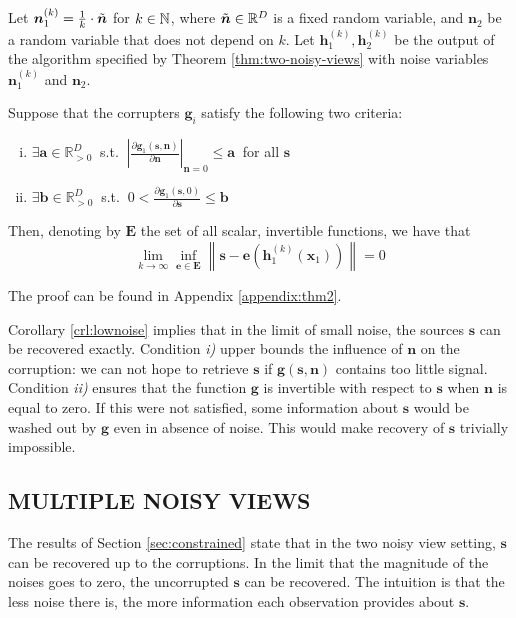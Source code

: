 \documentclass[letterpaper]{article}
\theoremstyle{definition}
\begin{document}
\begin{corollary}
\label{crl:lownoise}
Let $\bm{n}_1^{(k)} = \frac{1}{k} \cdot  \Tilde{\bm{n}}$ for $k \in \mathbb{N}$, where $\Tilde{\bm{n}}\in\mathbb{R}^D$ is a fixed random variable, and $\bm{n}_2$ be a random variable that does not depend on $k$.
Let $\bm{h}_1^{(k)}, \bm{h}_2^{(k)}$ be the output of the algorithm specified by Theorem \ref{thm:two-noisy-views} with noise variables $\bm{n}_1^{(k)}$ and $\bm{n}_2$.

Suppose that the corrupters $\bm{g}_i$ satisfy the following two criteria:
\begin{enumerate}[i)]
    \item $\exists \bm{a}  \in \mathbb{R}_{> 0}^D \: $   s.t. $\: \left|\frac{\partial \bm{g}_1(\bm{s},\bm{n})}{\partial \bm{n}} \right|_{\bm{n}=0} \leq \bm{a} \: $ for all $\bm{s}$
    \item $\exists \bm{b}  \in \mathbb{R}_{> 0}^D \: $ s.t. $\: 0<\frac{\partial \bm{g}_1(\bm{s},0)}{\partial \bm{s}} \leq \bm{b}$
\end{enumerate}
Then, denoting by $\bm{E}$ the set of all scalar, invertible functions, we have that
\[
\lim_{k \to \infty} \inf_{\bm{e}\in \bm{E}} \left \|\bm{s} - \bm{e}(\bm{h}_1^{(k)}(\bm{x}_1)) \right \| = 0
\]
\end{corollary}
The proof can be found in Appendix \ref{appendix:thm2}.

Corollary \ref{crl:lownoise} implies that in the limit of small noise, the sources $\bm{s}$ can be recovered exactly.
Condition \textit{i)} upper bounds the influence of $\bm{n}$ on the corruption: we can not hope to retrieve $\bm{s}$ if $\bm{g}(\bm{s}, \bm{n})$ contains too little signal.
Condition \textit{ii)} ensures that the function $\bm{g}$ is invertible with respect to $\bm{s}$ when $\bm{n}$ is equal to zero.
If this were not satisfied, some information about $\bm{s}$ would be washed out by $\bm{g}$ even in absence of noise.
This would make recovery of $\bm{s}$ trivially impossible.


\subsection{MULTIPLE NOISY VIEWS}
\label{sec:multiple}

The results of Section \ref{sec:constrained} state that in the two noisy view setting, $\bm{s}$ can be recovered up to the corruptions.
In the limit that the magnitude of the noises goes to zero, the uncorrupted $\bm{s}$ can be recovered.
The intuition is that the less noise there is, the more information each observation provides about $\bm{s}$.
\end{document}
